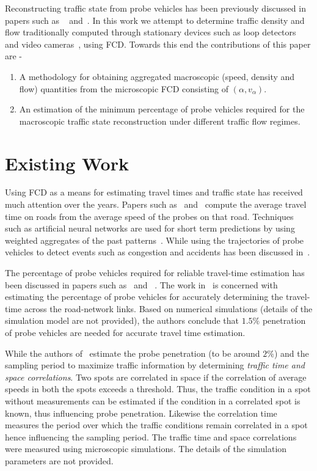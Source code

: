 \documentclass[procedia]{easychair}
\begin{document}
Reconstructing traffic state from probe vehicles has been previously discussed in papers such as ~\cite{kerner2005traffic,hong2007spatial} and~\cite{de2008traffic}. In this work we attempt to determine traffic density and flow  traditionally computed through stationary devices such as loop detectors~\cite{cheung2005traffic} and video cameras~\cite{coifman1998real}, using FCD. Towards this end the contributions of this paper are -

\begin{enumerate}
\item  A methodology for obtaining aggregated macroscopic (speed, density and flow) quantities from the microscopic FCD consisting of $(\alpha, v_{\alpha})$.
\item  An estimation of the minimum percentage of probe vehicles required for the macroscopic traffic state reconstruction  under different traffic flow regimes. 
\end{enumerate}

 
 \section{Existing Work}
 \label{sec:lit-review}
 
 Using FCD as a means for estimating travel times and traffic state has received much attention over the years. Papers such as~\cite{de2008traffic} and~\cite{nanthawichit2003application} compute the average travel time on roads from the average speed of the probes on that road. Techniques such as artificial neural networks are used for short term predictions by using weighted aggregates of the past patterns~\cite{de2008traffic}. While using the trajectories of probe vehicles to detect events such as congestion and accidents has been discussed in~\cite{asakura2015incident}.  
 
 The percentage of probe vehicles required for reliable travel-time estimation has been discussed in papers such as~\cite{dai2003simulation} and ~\cite{hong2007spatial}. The work in~\cite{kerner2005traffic} is concerned with estimating the percentage of probe vehicles for accurately determining the travel-time across the road-network links. Based on numerical simulations (details of the simulation model are not provided), the authors conclude that $1.5\%$ penetration of probe vehicles are needed for accurate travel time estimation. 
 
 While the authors of~\cite{hong2007spatial} estimate the  probe penetration (to be around $2\%$) and the sampling period to maximize traffic information by determining {\it traffic time and space correlations}. Two spots are correlated in space if the correlation of average speeds in both the spots exceeds a threshold. Thus, the traffic condition in a spot without measurements can be estimated if the condition in a correlated spot is known, thus influencing probe penetration. Likewise the correlation time measures the period over which the traffic conditions remain correlated in a spot hence influencing the sampling period. The traffic time and space correlations were measured using microscopic simulations. The details of the simulation parameters are not provided.
 
\end{document}
